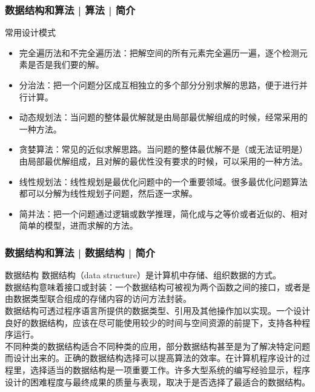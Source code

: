 \begin{frame}
  \frametitle{数据结构和算法 | 算法 | 简介}
  \begin{block}{常用设计模式}
    \begin{itemize}
      \item 完全遍历法和不完全遍历法：把解空间的所有元素完全遍历一遍，逐个检测元素是否是我们要的解。
      \item 分治法：把一个问题分区成互相独立的多个部分分别求解的思路，便于进行并行计算。
      \item 动态规划法：当问题的整体最优解就是由局部最优解组成的时候，经常采用的一种方法。
      \item 贪婪算法：常见的近似求解思路。当问题的整体最优解不是（或无法证明是）由局部最优解组成，且对解的最优性没有要求的时候，可以采用的一种方法。
      \item 线性规划法：线性规划是最优化问题中的一个重要领域。很多最优化问题算法都可以分解为线性规划子问题，然后逐一求解。
      \item 简并法：把一个问题通过逻辑或数学推理，简化成与之等价或者近似的、相对简单的模型，进而求解的方法。
    \end{itemize}
  \end{block}
\end{frame}

\begin{frame}
  \frametitle{数据结构和算法 | 数据结构 | 简介}
  \begin{block}{数据结构}
    数据结构（data structure）是计算机中存储、组织数据的方式。\\
    \vspace{0.5em}
数据结构意味着接口或封装：一个数据结构可被视为两个函数之间的接口，或者是由数据类型联合组成的存储内容的访问方法封装。\\
    \vspace{0.5em}
数据结构可透过程序语言所提供的数据类型、引用及其他操作加以实现。一个设计良好的数据结构，应该在尽可能使用较少的时间与空间资源的前提下，支持各种程序运行。\\
    \vspace{0.5em}
不同种类的数据结构适合不同种类的应用，部分数据结构甚至是为了解决特定问题而设计出来的。\alert{正确的数据结构选择可以提高算法的效率。}在计算机程序设计的过程里，选择适当的数据结构是一项重要工作。许多大型系统的编写经验显示，程序设计的困难程度与最终成果的质量与表现，取决于是否选择了最适合的数据结构。
  \end{block}
\end{frame}

